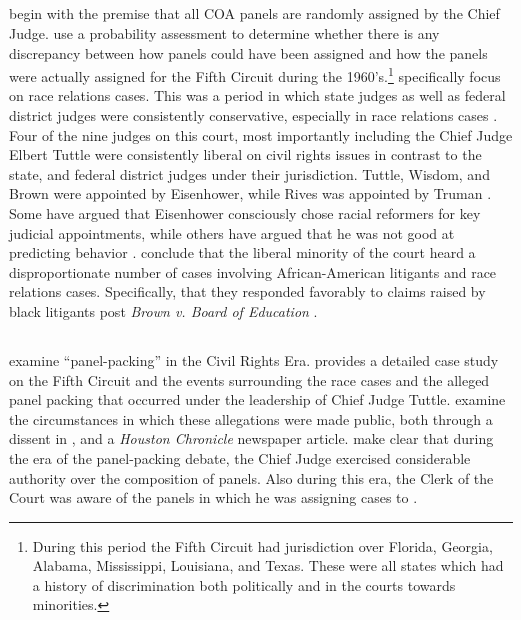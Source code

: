 \documentclass[12pt]{article}
\begin{document}
\subsection*{\cite{Atkins1974}}
\citet{Atkins1974} begin with the premise that all COA panels are randomly assigned by the Chief Judge.  \citet{Atkins1974} use a probability assessment to determine whether there is any discrepancy between how panels could have been assigned and how the panels were actually assigned for the Fifth Circuit during the 1960's.\footnote{During this period the Fifth Circuit had jurisdiction over Florida, Georgia, Alabama, Mississippi, Louisiana, and Texas.  These were all states which had a history of discrimination both politically and in the courts towards minorities.}  \citeauthor{Atkins1974} specifically focus on race relations cases.  This was a period in which state judges as well as federal district judges were consistently conservative, especially in race relations cases \citep{Atkins1974}.  Four of the nine judges on this court, most importantly including the Chief Judge Elbert Tuttle were consistently liberal on civil rights issues in contrast to the state, and federal district judges under their jurisdiction.  Tuttle, Wisdom, and Brown were appointed by Eisenhower, while Rives was appointed by Truman \citep{FJC}.   Some have argued that Eisenhower consciously chose racial reformers for key judicial appointments, while others have argued that he was not good at predicting behavior  \citep{kahn1992shattering,ambrose1984eisenhower}.  \cite{Atkins1974} conclude that the liberal minority of the court heard a disproportionate number of cases involving African-American litigants and race relations cases.  Specifically, that they responded favorably to claims raised by black litigants post \textit{Brown v. Board of Education} \citeyearpar{warren1954brown}.

\subsection*{\cite{Brown2000}}
\citet{Brown2000} examine ``panel-packing'' in the Civil Rights Era.  \citeauthor{Brown2000} provides a detailed case study on the Fifth Circuit and the events surrounding the race cases and the alleged panel packing that occurred under the leadership of Chief Judge Tuttle.  \citeauthor{Brown2000} examine the circumstances in which these allegations were made public, both through a dissent in \citet{Armstrong}, and a \textit{Houston Chronicle} newspaper article.  \citeauthor{Brown2000} make clear that during the era of the panel-packing debate, the Chief Judge exercised considerable authority over the composition of panels.  Also during this era, the Clerk of the Court was aware of the panels in which he was assigning cases to \citep{Brown2000}. 
\end{document}
